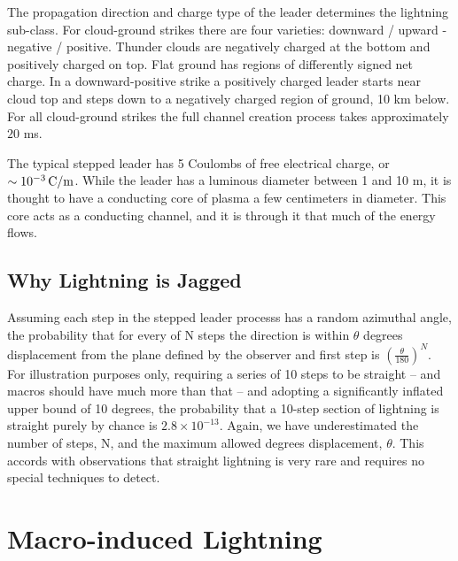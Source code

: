 \documentclass[%
 reprint,
 amsmath,amssymb,
 aps,
]{revtex4-2}
\begin{document}
    The propagation direction and charge type of the leader determines the lightning sub-class. For cloud-ground strikes there are four varieties: downward / upward - negative / positive. Thunder clouds are negatively charged at the bottom and positively charged on top. Flat ground has regions of differently signed net charge. In a downward-positive strike a positively charged leader starts near cloud top and steps down to a negatively charged region of ground, 10 km below. For all cloud-ground strikes the full channel creation process takes approximately $20$ ms.

    The typical stepped leader has 5 Coulombs of free electrical charge, or $\sim10^{-3} \, \rm{C/m}$. While the leader has a luminous diameter between 1 and 10 m, it is thought to have a conducting core of plasma a few centimeters in diameter. This core acts as a conducting channel, and it is through it that much of the energy flows.
    
    
    \subsection{Why Lightning is Jagged} %
    \label{sub:why_lightning_is_jagged}

        Assuming each step in the stepped leader processs has a random azimuthal angle, the probability that for every of N steps the direction is within $\theta$ degrees displacement from the plane defined by the observer and first step is $\left(\frac{\theta}{180}\right)^{N}$. For illustration purposes only, requiring a series of 10 steps to be straight -- and macros should have much more than that -- and adopting a significantly inflated upper bound of 10 degrees, the probability that a 10-step section of lightning is straight purely by chance is $2.8 \times 10^{-13}$. Again, we have underestimated the number of steps, N, and the maximum allowed degrees displacement, $\theta$. This accords with observations that straight lightning is very rare and requires no special techniques to detect.
        



\section{Macro-induced \textbf{}Lightning} %
\label{sec:macro_induced_lightning}
\end{document}
